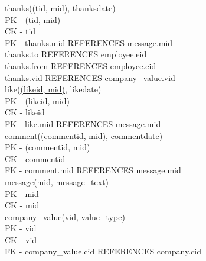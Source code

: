 \documentclass[11pt]{report}
\begin{document}
thanks(\underline{(tid, mid)}, thanksdate) \\
PK - (tid, mid) \\
CK - tid \\
FK - thanks.mid REFERENCES message.mid \\
     thanks.to REFERENCES employee.eid \\
     thanks.from REFERENCES employee.eid \\
     thanks.vid REFERENCES company\_value.vid \\

like(\underline{(likeid, mid)}, likedate) \\
PK - (likeid, mid) \\
CK - likeid \\
FK - like.mid REFERENCES message.mid \\

comment(\underline{(commentid, mid)}, commentdate) \\
PK - (commentid, mid) \\
CK - commentid \\
FK - comment.mid REFERENCES message.mid \\

message(\underline{mid}, message\_text) \\
PK - mid \\
CK - mid \\

company\_value(\underline{vid}, value\_type) \\
PK - vid \\
CK - vid \\
FK - company\_value.cid REFERENCES company.cid
\clearpage
\end{document}
